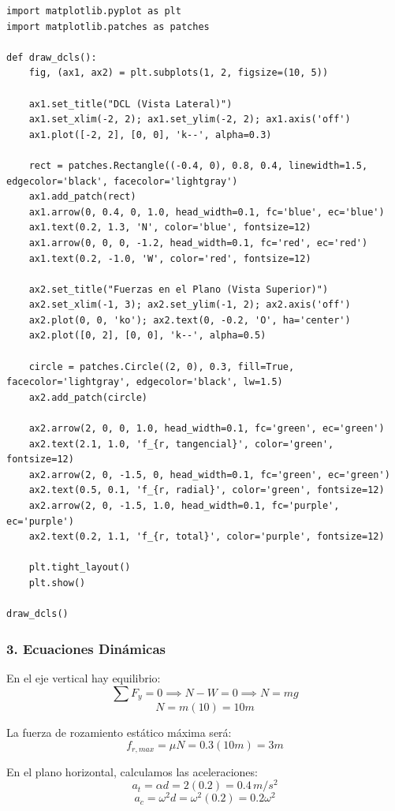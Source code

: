 \documentclass[12pt, a4paper]{article}
\begin{document}
\begin{lstlisting}
import matplotlib.pyplot as plt
import matplotlib.patches as patches

def draw_dcls():
    fig, (ax1, ax2) = plt.subplots(1, 2, figsize=(10, 5))

    ax1.set_title("DCL (Vista Lateral)")
    ax1.set_xlim(-2, 2); ax1.set_ylim(-2, 2); ax1.axis('off')
    ax1.plot([-2, 2], [0, 0], 'k--', alpha=0.3)
    
    rect = patches.Rectangle((-0.4, 0), 0.8, 0.4, linewidth=1.5, edgecolor='black', facecolor='lightgray')
    ax1.add_patch(rect)
    ax1.arrow(0, 0.4, 0, 1.0, head_width=0.1, fc='blue', ec='blue')
    ax1.text(0.2, 1.3, 'N', color='blue', fontsize=12)
    ax1.arrow(0, 0, 0, -1.2, head_width=0.1, fc='red', ec='red')
    ax1.text(0.2, -1.0, 'W', color='red', fontsize=12)

    ax2.set_title("Fuerzas en el Plano (Vista Superior)")
    ax2.set_xlim(-1, 3); ax2.set_ylim(-1, 2); ax2.axis('off')
    ax2.plot(0, 0, 'ko'); ax2.text(0, -0.2, 'O', ha='center')
    ax2.plot([0, 2], [0, 0], 'k--', alpha=0.5)
    
    circle = patches.Circle((2, 0), 0.3, fill=True, facecolor='lightgray', edgecolor='black', lw=1.5)
    ax2.add_patch(circle)
    
    ax2.arrow(2, 0, 0, 1.0, head_width=0.1, fc='green', ec='green')
    ax2.text(2.1, 1.0, 'f_{r, tangencial}', color='green', fontsize=12)
    ax2.arrow(2, 0, -1.5, 0, head_width=0.1, fc='green', ec='green')
    ax2.text(0.5, 0.1, 'f_{r, radial}', color='green', fontsize=12)
    ax2.arrow(2, 0, -1.5, 1.0, head_width=0.1, fc='purple', ec='purple')
    ax2.text(0.2, 1.1, 'f_{r, total}', color='purple', fontsize=12)

    plt.tight_layout()
    plt.show()

draw_dcls()
\end{lstlisting}

\subsubsection*{3. Ecuaciones Dinámicas}
En el eje vertical hay equilibrio:
$$ \sum F_y = 0 \implies N - W = 0 \implies N = m g $$
$$ N = m (10) = 10m $$

La fuerza de rozamiento estático máxima será:
$$ f_{r,max} = \mu N = 0.3 (10m) = 3m $$

En el plano horizontal, calculamos las aceleraciones:
$$ a_t = \alpha d = 2(0.2) = 0.4 \, \si{m/s^2} $$
$$ a_c = \omega^2 d = \omega^2 (0.2) = 0.2 \omega^2 $$
\end{document}
